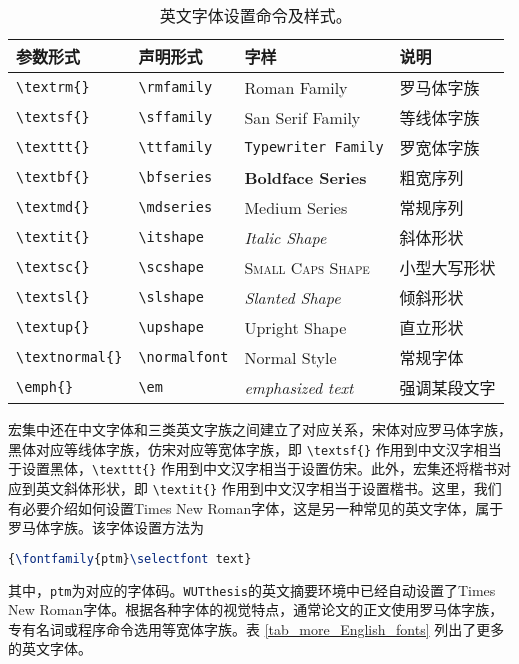 \begin{table}
\caption{英文字体设置命令及样式。}
\begin{center}
\begin{tabular}{>{\centering\arraybackslash}m{3.0cm}|>{\centering\arraybackslash}m{2.5cm}|>{\centering\arraybackslash}m{4.0cm}|>{\centering\arraybackslash}m{3.0cm}}
\hline
\hline
参数形式 & 声明形式 & 字样 & 说明 \bigstrut \\ \hline
\verb"\textrm{}" & \verb"\rmfamily" & \textrm{Roman Family} & 罗马体字族 \bigstrut \\ \hline
\verb"\textsf{}" & \verb"\sffamily" & \textsf{San Serif Family} & 等线体字族 \bigstrut \\ \hline
\verb"\texttt{}" & \verb"\ttfamily" & \texttt{Typewriter Family} & 罗宽体字族 \bigstrut \\ \hline
\verb"\textbf{}" & \verb"\bfseries" & \textbf{Boldface Series} & 粗宽序列 \bigstrut \\ \hline
\verb"\textmd{}" & \verb"\mdseries" & \textmd{Medium Series} & 常规序列 \bigstrut \\ \hline
\verb"\textit{}" & \verb"\itshape"  & \textit{Italic Shape} & 斜体形状 \bigstrut \\ \hline
\verb"\textsc{}" & \verb"\scshape"  & \textsc{Small Caps Shape} & 小型大写形状 \bigstrut \\ \hline
\verb"\textsl{}" & \verb"\slshape"  & \textsl{Slanted Shape} & 倾斜形状 \bigstrut \\ \hline
\verb"\textup{}" & \verb"\upshape"  & \textup{Upright Shape} & 直立形状 \bigstrut \\ \hline
\verb"\textnormal{}" & \verb"\normalfont" & \textnormal{Normal Style} & 常规字体 \bigstrut \\ \hline
\verb"\emph{}" & \verb"\em" & \emph{emphasized text} & 强调某段文字 \bigstrut \\ \hline
\hline
\end{tabular}
\end{center}
\label{tab_font_style}
\end{table}

\par {\CTeX}宏集中还在中文字体和三类英文字族之间建立了对应关系，宋体对应罗马体字族，黑体对应等线体字族，仿宋对应等宽体字族，即 \verb"\textsf{}" 作用到中文汉字相当于设置黑体，\verb"\texttt{}" 作用到中文汉字相当于设置仿宋。此外，{\CTeX}宏集还将楷书对应到英文斜体形状，即 \verb"\textit{}" 作用到中文汉字相当于设置楷书。这里，我们有必要介绍如何设置{\selectfont Times New Roman}字体，这是另一种常见的英文字体，属于罗马体字族。该字体设置方法为
\begin{lstlisting}[language=TeX]
{\fontfamily{ptm}\selectfont text}
\end{lstlisting}
其中，\texttt{ptm}为对应的字体码。\texttt{WUTthesis}的英文摘要环境中已经自动设置了{\selectfont Times New Roman}字体。根据各种字体的视觉特点，通常论文的正文使用罗马体字族，专有名词或程序命令选用等宽体字族。表 \ref{tab_more_English_fonts} 列出了更多的英文字体。




